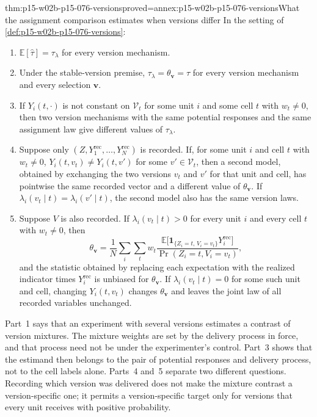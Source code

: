 \begin{hbtheorem}{thm:p15-w02b-p15-076-versions}{proved=annex:p15-w02b-p15-076-versions}{What the assignment comparison estimates when versions differ}
In the setting of \cref{def:p15-w02b-p15-076-versions}:
\begin{enumerate}
\item \(\mathbb E[\widehat\tau]=\tau_\lambda\) for every version
      mechanism.
\item Under the stable-version premise,
      \(\tau_\lambda=\theta_{\mathbf v}=\tau\) for every version mechanism
      and every selection \(\mathbf v\).
\item If \(Y_i(t,\cdot)\) is not constant on \(\mathcal V_t\) for some unit
      \(i\) and some cell \(t\) with \(w_t\ne0\), then two version mechanisms
      with the same potential responses and the same assignment law give
      different values of \(\tau_\lambda\).
\item Suppose only \((Z,Y_1^{\mathrm{rec}},\ldots,Y_N^{\mathrm{rec}})\) is
      recorded. If, for some unit \(i\) and cell \(t\) with \(w_t\ne0\),
      \(Y_i(t,v_t)\ne Y_i(t,v')\) for some \(v'\in\mathcal V_t\), then a
      second model, obtained by exchanging the two versions \(v_t\) and
      \(v'\) for that unit and cell, has pointwise the same recorded
      vector and a different value of \(\theta_{\mathbf v}\). If
      \(\lambda_i(v_t\mid t)=\lambda_i(v'\mid t)\), the second model also
      has the same version laws.
\item Suppose \(V\) is also recorded. If
      \(\lambda_i(v_t\mid t)>0\) for every unit \(i\) and every cell \(t\)
      with \(w_t\ne0\), then
      \[
       \theta_{\mathbf v}=\frac1N\sum_i\sum_tw_t
        \frac{\mathbb E\bigl[\mathbf 1_{\{Z_i=t,\,V_i=v_t\}}Y_i^{\mathrm{rec}}\bigr]}
             {\Pr(Z_i=t,V_i=v_t)},
      \]
      and the statistic obtained by replacing each expectation with the
      realized indicator times \(Y_i^{\mathrm{rec}}\) is unbiased for
      \(\theta_{\mathbf v}\). If \(\lambda_i(v_t\mid t)=0\) for some such
      unit and cell, changing \(Y_i(t,v_t)\) changes
      \(\theta_{\mathbf v}\) and leaves the joint law of all recorded
      variables unchanged.
\end{enumerate}
\end{hbtheorem}

Part~1 says that an experiment with several versions estimates a contrast
of version mixtures. The mixture weights are set by the delivery process
in force, and that process need not be under the experimenter's control.
Part~3 shows that the estimand then belongs to the pair of potential
responses and delivery process, not to the cell labels alone. Parts~4 and~5
separate two different questions. Recording which version was delivered
does not make the mixture contrast a version-specific one; it permits a
version-specific target only for versions that every unit receives with
positive probability.

